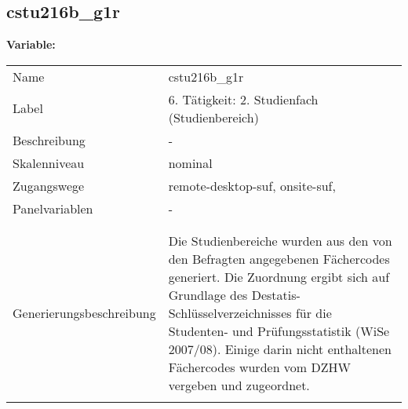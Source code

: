 	
	
	\subsection{cstu216b\_g1r}
	\label{subSection:cstu216b_g1r}

	\noindent\textbf{Variable:}\\
		\begin{tabular}{lL{11.3cm}}
			\label{tableVariable:cstu216b_g1r}
			Name & cstu216b\_g1r \\
			Label & 6. Tätigkeit: 2. Studienfach (Studienbereich) \\
			Beschreibung & - \\
			Skalenniveau & nominal \\
			Zugangswege &
				remote-desktop-suf,
				onsite-suf,
 \\
			Panelvariablen & -
			 \\
			 \\
 \\
					Generierungsbeschreibung & Die Studienbereiche wurden aus den von den Befragten angegebenen Fächercodes generiert. Die Zuordnung ergibt sich auf Grundlage des Destatis-Schlüsselverzeichnisses für die Studenten- und Prüfungsstatistik (WiSe 2007/08). Einige darin nicht enthaltenen Fächercodes wurden vom DZHW vergeben und zugeordnet. 
				 \\	
			 \\
		\end{tabular}






